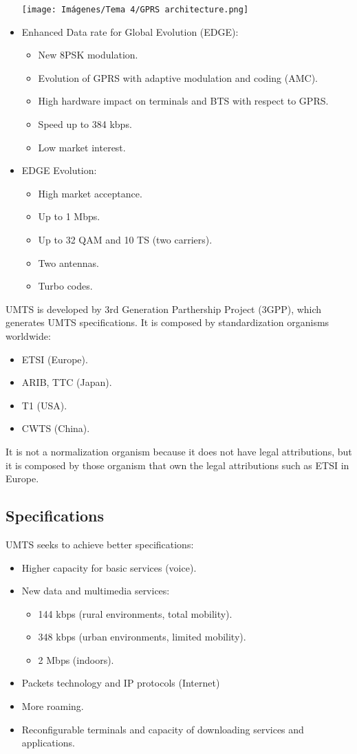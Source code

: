 \documentclass[
	12pt,
	twoside
]{book}
\begin{document}
\begin{itemize}
{		\texttt{[image: Imágenes/Tema 4/GPRS architecture.png]}
	}
	\item {
		Enhanced Data rate for Global Evolution (EDGE):
		\begin{itemize}
			\item New 8PSK modulation.
			\item Evolution of GPRS with adaptive modulation and coding (AMC).
			\item High hardware impact on terminals and BTS with respect to GPRS.
			\item Speed up to 384 kbps.
			\item Low market interest.
		\end{itemize}
	}
	\item {
		EDGE Evolution:
		\begin{itemize}
			\item High market acceptance.
			\item Up to 1 Mbps.
			\item Up to 32 QAM and 10 TS (two carriers).
			\item Two antennas.
			\item Turbo codes.
		\end{itemize}
	}
\end{itemize}

UMTS is developed by 3rd Generation Parthership Project (3GPP), which generates UMTS specifications. It is composed by standardization organisms worldwide:
\begin{itemize}
	\item ETSI (Europe).
	\item ARIB, TTC (Japan).
	\item T1 (USA).
	\item CWTS (China).
\end{itemize}

It is not a normalization organism because it does not have legal attributions, but it is composed by those organism that own the legal attributions such as ETSI in Europe.

\subsection{Specifications}

UMTS seeks to achieve better specifications:
\begin{itemize}
	\item Higher capacity for basic services (voice).
	\item {
		New data and multimedia services:
		\begin{itemize}
			\item 144 kbps (rural environments, total mobility).
			\item 348 kbps (urban environments, limited mobility).
			\item 2 Mbps (indoors).
		\end{itemize}
	}
	\item Packets technology and IP protocols (Internet)
	\item More roaming.
	\item Reconfigurable terminals and capacity of downloading services and applications.
\end{itemize}
\end{document}
